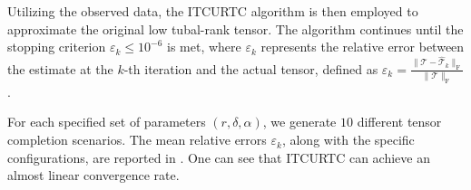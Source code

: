\documentclass[twoside,12pt]{article}
\def\fro{{\mathrm{F}}}
\def\fro{{\mathrm{F}}}
\begin{document}
Utilizing the observed data, the ITCURTC algorithm is then employed to approximate the original low tubal-rank tensor. The algorithm continues until the stopping criterion $\varepsilon_k \leq 10^{-6}$ is met, where $\varepsilon_k$ represents the relative error between the estimate at the $k$-th iteration and the actual tensor, defined as $\varepsilon_k = \frac{\|\mathcal{T} - \mathcal{\widehat{T}}_k\|_{\fro}}{\|\mathcal{T}\|_{\fro}}$.

For each specified set of parameters $(r, \delta, \alpha)$, we generate $10$ different tensor completion scenarios. The mean relative errors $\varepsilon_k$, along with the specific configurations, are reported in . One can see that ITCURTC can achieve an almost linear convergence rate.

 
\end{document}
